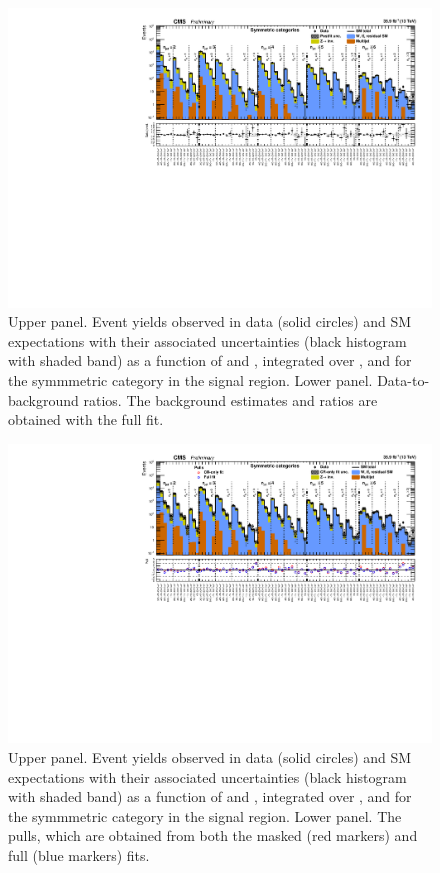 \clearpage
\begin{figure}[h!]
  \centering
  \caption{Upper panel. Event yields observed in data (solid circles)
    and SM expectations with their associated uncertainties (black
    histogram with shaded band) as a function of \nb and \scalht,
    integrated over \mht, and for the symmmetric \njet category
    in the signal region. Lower panel. Data-to-background ratios. The
    background estimates and ratios are obtained with the full fit. }
  \label{fig:mr_symm_post}
  \includegraphics[width=1.\linewidth]{figures/results/36invfb_freeze/symm/summaryPlot_Symmetric_fit_b}
\end{figure}

\clearpage
\begin{figure}[h!]
  \centering
  \caption{Upper panel. Event yields observed in data (solid circles)
    and SM expectations with their associated uncertainties (black
    histogram with shaded band) as a function of \nb and \scalht,
    integrated over \mht, and for the symmmetric \njet category
    in the signal region. Lower panel. The pulls, which are obtained
    from both the masked (red markers) and full (blue markers) fits. }
  \label{fig:mr_symm_pulls}
  \includegraphics[width=1.\linewidth]{figures/results/36invfb_freeze/symm/summaryPlot_Symmetric_prefit_overlay_fit_b}
\end{figure}

